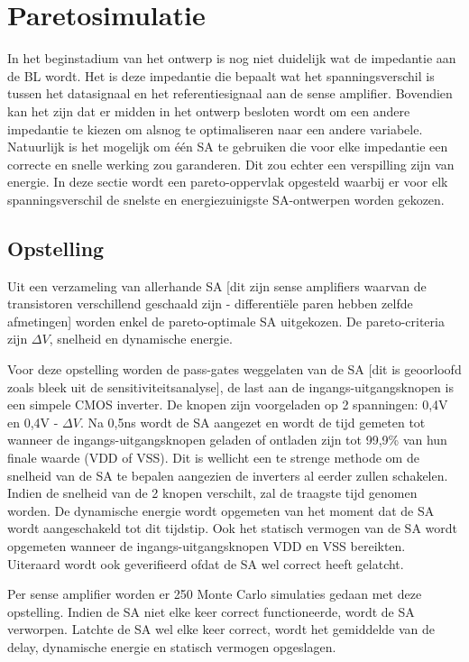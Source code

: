 \section{Paretosimulatie}
In het beginstadium van het ontwerp is nog niet duidelijk wat de impedantie aan de BL wordt. Het is deze impedantie die bepaalt wat het spanningsverschil is tussen het datasignaal en het referentiesignaal aan de sense amplifier. Bovendien kan het zijn dat er midden in het ontwerp besloten wordt om een andere impedantie te kiezen om alsnog te optimaliseren naar een andere variabele.
Natuurlijk is het mogelijk om één SA te gebruiken die voor elke impedantie een correcte en snelle werking zou garanderen. Dit zou echter een verspilling zijn van energie. In deze sectie wordt een pareto-oppervlak opgesteld waarbij er voor elk spanningsverschil de snelste en energiezuinigste SA-ontwerpen worden gekozen.

\subsection{Opstelling}
Uit een verzameling van allerhande SA [dit zijn sense amplifiers waarvan de transistoren verschillend geschaald zijn - differentiële paren hebben zelfde afmetingen] worden enkel de pareto-optimale SA uitgekozen. De pareto-criteria zijn $\Delta V$, snelheid en dynamische energie. 

Voor deze opstelling worden de pass-gates weggelaten van de SA [dit is geoorloofd zoals bleek uit de sensitiviteitsanalyse], de last aan de ingangs-uitgangsknopen is een simpele CMOS inverter. De knopen zijn voorgeladen op 2 spanningen: 0,4V en 0,4V - $\Delta V$. Na 0,5ns wordt de SA aangezet en wordt de tijd gemeten tot wanneer de ingangs-uitgangsknopen geladen of ontladen zijn tot 99,9\% van hun finale waarde (VDD of VSS). Dit is wellicht een te strenge methode om de snelheid van de SA te bepalen aangezien de inverters al eerder zullen schakelen. Indien de snelheid van de 2 knopen verschilt, zal de traagste tijd genomen worden. De dynamische energie wordt opgemeten van het moment dat de SA wordt aangeschakeld tot dit tijdstip. Ook het statisch vermogen van de SA wordt opgemeten wanneer de ingangs-uitgangsknopen VDD en VSS bereikten. Uiteraard wordt ook geverifieerd ofdat de SA wel correct heeft gelatcht.

Per sense amplifier worden er 250 Monte Carlo simulaties gedaan met deze opstelling. Indien de SA niet elke keer correct functioneerde, wordt de SA verworpen. Latchte de SA wel elke keer correct, wordt het gemiddelde van de delay, dynamische energie  en statisch vermogen opgeslagen. 

